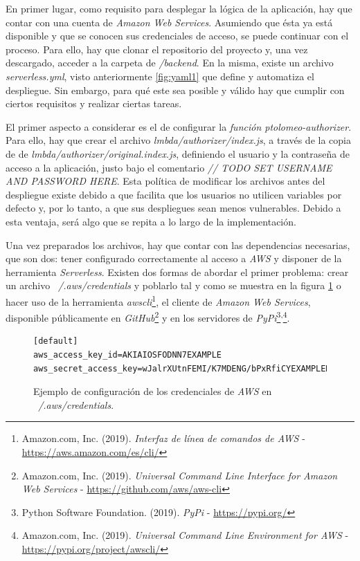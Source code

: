 \documentclass[11pt,spanish,listoffigures]{tfgetsinf}
\begin{document}
En primer lugar, como requisito para desplegar la lógica de la aplicación, hay que contar con una cuenta de \textit{Amazon Web Services}. Asumiendo que ésta ya está disponible y que se conocen sus credenciales de acceso, se puede continuar con el proceso. Para ello, hay que clonar el repositorio del proyecto \cite{ptolomeo} y, una vez descargado, acceder a la carpeta de \textit{/backend}. En la misma, existe un archivo \textit{serverless.yml}, visto anteriormente \ref{fig:yaml1} que define y automatiza el despliegue. Sin embargo, para qué este sea posible y válido hay que cumplir con ciertos requisitos y realizar ciertas tareas.

El primer aspecto a considerar es el de configurar la \textit{función ptolomeo-authorizer}. Para ello, hay que crear el archivo \textit{lmbda/authorizer/index.js}, a través de la copia de de \textit{lmbda/authorizer/original.index.js}, definiendo el usuario y la contraseña de acceso a la aplicación, justo bajo el comentario \textit{// TODO SET USERNAME AND PASSWORD HERE}. Esta política de modificar los archivos antes del despliegue existe debido a que facilita que los usuarios no utilicen variables por defecto y, por lo tanto, a que sus despliegues sean menos vulnerables. Debido a esta ventaja, será algo que se repita a lo largo de la implementación.

Una vez preparados los archivos, hay que contar con las dependencias necesarias, que son dos: tener configurado correctamente al acceso a \textit{AWS} y disponer de la herramienta \textit{Serverless}. Existen dos formas de abordar el primer problema: crear un archivo\textit{ ~/.aws/credentials} y poblarlo tal y como se muestra en la figura \ref{fig:aws-credentials} o hacer uso de la herramienta \textit{awscli}\footnote{Amazon.com, Inc. (2019). \textit{Interfaz de línea de comandos de AWS} - \url{https://aws.amazon.com/es/cli/}}, el cliente de \textit{Amazon Web Services}, disponible públicamente en \textit{GitHub}\footnote{Amazon.com, Inc. (2019). \textit{Universal Command Line Interface for Amazon Web Services} - \url{https://github.com/aws/aws-cli}} y en los servidores de \textit{PyPi}\footnote{Python Software Foundation. (2019). \textit{PyPi} - \url{https://pypi.org/}}\textsuperscript{,}\footnote{Amazon.com, Inc. (2019). \textit{Universal Command Line Environment for AWS} - \url{https://pypi.org/project/awscli/}}.


\begin{figure}[h!]
    \centering
    \begin{lstlisting}
[default]
aws_access_key_id=AKIAIOSFODNN7EXAMPLE
aws_secret_access_key=wJalrXUtnFEMI/K7MDENG/bPxRfiCYEXAMPLEKEY
    \end{lstlisting}
    \caption{Ejemplo de configuración de los credenciales de \textit{AWS} en \textit{~/.aws/credentials}.}
    \label{fig:aws-credentials}
\end{figure}
\end{document}
